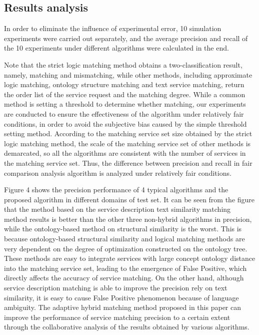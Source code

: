 \documentclass{ieeeaccess}
\begin{document}
\subsection{Results analysis}
In order to eliminate the influence of experimental error, 10 simulation experiments were carried out separately, and the average precision and recall of the 10 experiments under different algorithms were calculated in the end.

Note that the strict logic matching method obtains a two-classification result, namely, matching and mismatching, while other methods, including approximate logic matching, ontology structure matching and text service matching, return the order list of the service request and the matching degree. While a common method is setting a threshold to determine whether matching, our experiments are conducted to ensure the effectiveness of the algorithm under relatively fair conditions, in order to avoid the subjective bias caused by the simple threshold setting method. According to the matching service set size obtained by the strict logic matching method, the scale of the matching service set of other methods is demarcated, so all the algorithms are consistent with the number of services in the matching service set. Thus, the difference between precision and recall in fair comparison analysis algorithm is analyzed under relatively fair conditions.

Figure 4 shows the precision performance of 4 typical algorithms and the proposed algorithm in different domains of test set. It can be seen from the figure that the method based on the service description text similarity matching method results is better than the other three non-hybrid algorithms in precision, while the ontology-based method on structural similarity is the worst. This is because ontology-based structural similarity and logical matching methods are very dependent on the degree of optimization constructed on the ontology tree. These methods are easy to integrate services with large concept ontology distance into the matching service set, leading to the emergence of False Positive, which directly affects the accuracy of service matching. On the other hand, although service description matching is able to improve the precision rely on text similarity, it is easy to cause False Positive phenomenon because of language ambiguity. The adaptive hybrid matching method proposed in this paper can improve the performance of service matching precision to a certain extent through the collaborative analysis of the results obtained by various algorithms.
 
\end{document}

